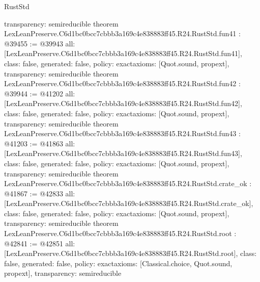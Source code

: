 \begin{lexlean}{RustStd}
\begin{coremodule}
{  transparency: semireducible
}
theorem LexLeanPreserve.C6d1bc0bcc7cbbb3a169c4e838883ff45.R24.RustStd.fun41 : @39455 := @39943 {
  all: [LexLeanPreserve.C6d1bc0bcc7cbbb3a169c4e838883ff45.R24.RustStd.fun41],
  class: false,
  generated: false,
  policy: exact{axioms: [Quot.sound, propext]},
  transparency: semireducible
}
theorem LexLeanPreserve.C6d1bc0bcc7cbbb3a169c4e838883ff45.R24.RustStd.fun42 : @39944 := @41202 {
  all: [LexLeanPreserve.C6d1bc0bcc7cbbb3a169c4e838883ff45.R24.RustStd.fun42],
  class: false,
  generated: false,
  policy: exact{axioms: [Quot.sound, propext]},
  transparency: semireducible
}
theorem LexLeanPreserve.C6d1bc0bcc7cbbb3a169c4e838883ff45.R24.RustStd.fun43 : @41203 := @41863 {
  all: [LexLeanPreserve.C6d1bc0bcc7cbbb3a169c4e838883ff45.R24.RustStd.fun43],
  class: false,
  generated: false,
  policy: exact{axioms: [Quot.sound, propext]},
  transparency: semireducible
}
theorem LexLeanPreserve.C6d1bc0bcc7cbbb3a169c4e838883ff45.R24.RustStd.crate_ok : @41867 := @42833 {
  all: [LexLeanPreserve.C6d1bc0bcc7cbbb3a169c4e838883ff45.R24.RustStd.crate_ok],
  class: false,
  generated: false,
  policy: exact{axioms: [Quot.sound, propext]},
  transparency: semireducible
}
theorem LexLeanPreserve.C6d1bc0bcc7cbbb3a169c4e838883ff45.R24.RustStd.root : @42841 := @42851 {
  all: [LexLeanPreserve.C6d1bc0bcc7cbbb3a169c4e838883ff45.R24.RustStd.root],
  class: false,
  generated: false,
  policy: exact{axioms: [Classical.choice, Quot.sound, propext]},
  transparency: semireducible
}


\end{coremodule}
\end{lexlean}

